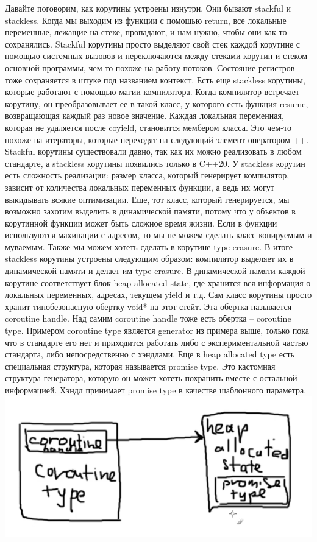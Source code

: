 \documentclass[12pt, a4paper]{article}
\begin{document}
\par Давайте поговорим, как корутины устроены изнутри. Они бывают stackful и stackless. Когда мы выходим из функции с помощью return, все локальные переменные, лежащие на стеке, пропадают, и нам нужно, чтобы они как-то сохранялись. Stackful корутины просто выделяют свой стек каждой корутине с помощью системных вызовов и переключаются между стеками корутин и стеком основной программы, чем-то похоже на работу потоков. Состояние регистров тоже сохраняется в штуке под названием контекст. Есть еще stackless корутины, которые работают с помощью магии компилятора. Когда компилятор встречает корутину, он преобразовывает ее в такой класс, у которого есть функция resume, возвращающая каждый раз новое значение. Каждая локальная переменная, которая не удаляется после co\textunderscore yield, становится мембером класса. Это чем-то похоже на итераторы, которые переходят на следующий элемент оператором ++. Stackful корутины существовали давно, так как их можно реализовать в любом стандарте, а stackless корутины появились только в C++20. У stackless корутин есть сложность реализации: размер класса, который генерирует компилятор, зависит от количества локальных переменных функции, а ведь их могут выкидывать всякие оптимизации. Еще, тот класс, который генерируется, мы возможно захотим выделить в динамической памяти, потому что у объектов в корутинной функции может быть сложное время жизни. Если в функции используются махинации с адресом, то мы не можем сделать класс копируемым и муваемым. Также мы можем хотеть сделать в корутине type erasure. В итоге stackless корутины устроены следующим образом: компилятор выделяет их в динамической памяти и делает им type erasure. В динамической памяти каждой корутине соответствует блок heap allocated state, где хранится вся информация о локальных переменных, адресах, текущем yield и т.д. Сам класс корутины просто хранит типобезопасную обертку void* на этот стейт. Эта обертка называется coroutine handle. Над самим coroutine handle тоже есть обертка -- coroutine type. Примером coroutine type является generator из примера выше, только пока что в стандарте его нет и приходится работать либо с экспериментальной частью стандарта, либо непосредственно с хэндлами. Еще в heap allocated type есть специальная структура, которая называется promise type. Это кастомная структура генератора, которую он может хотеть похранить вместе с остальной информацией. Хэндл принимает promise type в качестве шаблонного параметра.\\
\includegraphics[scale=0.7]{coroutines.png}\\
\end{document}
